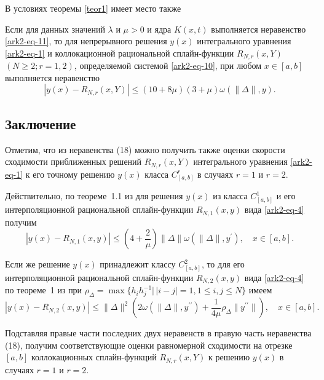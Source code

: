 В условиях теоремы \ref{teor1} имеет место также

\begin{theorem}\label{teor2}
Если для данных значений $\lambda$ и $\mu>0$ и ядра $K(x,t)$ выполняется неравенство \eqref{ark2-eq-11},
то для непрерывного решения $y(x)$ интегрального уравнения \eqref{ark2-eq-1} и коллокационной
рациональной сплайн-функции $R_{N,r}(x,Y)$ $(N\geqslant 2; r=1,2)$, определяемой системой \eqref{ark2-eq-10},
при любом $x\in[a,b]$ выполняется неравенство
$$
|y(x)-R_{N,r}(x,Y)|\leqslant (10+8\mu)(3+\mu)\omega(\|\Delta\|,y).
$$
\end{theorem}

\subsection{Заключение}

 Отметим, что из неравенства (18) можно получить также оценки скорости сходимости
приближенных решений $R_{N,r}(x,Y)$ интегрального уравнения \eqref{ark2-eq-1} к его точному решению $y(x)$
класса $C^r_{[a,b]}$ в случаях $r=1$ и $r=2$.

Действительно, по теореме~1.1 из \cite{ark-10} для решения $y(x)$ из класса $C^1_{[a,b]}$ и
его интерполяционной рациональной сплайн-функции $R_{N,1}(x,y)$ вида \eqref{ark2-eq-4} получим
$$
|y(x)-R_{N,1}(x,y)|\leqslant
\left(4+\frac 2\mu\right)\|\Delta\|\omega(\|\Delta\|,y^\prime),\quad x\in[a,b].
$$

Если же решение $y(x)$ принадлежит классу $C^2_{[a,b]}$, то для
его интерполяционной рациональной сплайн-функции $R_{N,2}(x,y)$ вида \eqref{ark2-eq-4}
по теореме~1 из \cite{ark-11} при
$\rho_\Delta=\max\{h_ih_j^{-1}|\,|i-j|=1, 1\leqslant i,j\leqslant N\}$ имеем
$$
|y(x)-R_{N,2}(x,y)|\leqslant \|\Delta\|^2\left(2\omega(\|\Delta\|,y^{\prime\prime})+
\frac1{4\mu} \rho_\Delta \|y^{\prime\prime}\|\right),\quad x\in[a,b].
$$

Подставляя правые части последних двух неравенств в правую часть неравенства (18), получим
соответствующие оценки равномерной сходимости на отрезке $[a,b]$ коллокационных сплайн-функций
$R_{N,r} (x,Y)$ к решению $y(x)$ в случаях $r=1$ и $r=2$.




